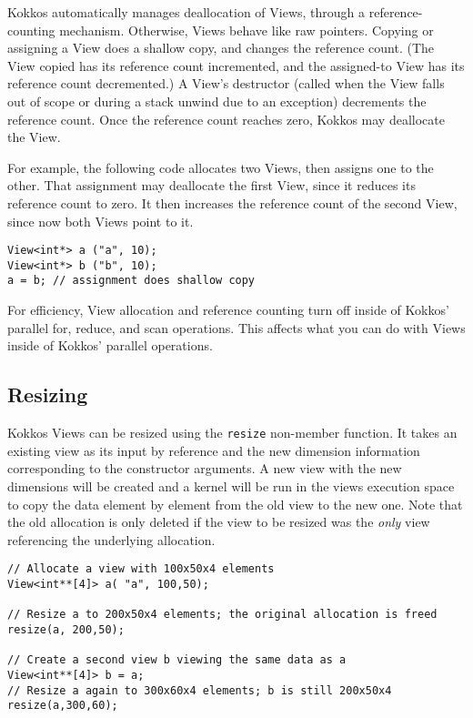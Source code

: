 Kokkos automatically manages deallocation of Views, through a
reference-counting mechanism.  Otherwise, Views behave like raw
pointers.  Copying or assigning a View does a shallow copy, and
changes the reference count.  (The View copied has its reference count
incremented, and the assigned-to View has its reference count
decremented.)  A View's destructor (called when the View falls out of
scope or during a stack unwind due to an exception) decrements the
reference count.  Once the reference count reaches zero, Kokkos may
deallocate the View.

For example, the following code allocates two Views, then assigns one
to the other.  That assignment may deallocate the first View, since it
reduces its reference count to zero.  It then increases the reference
count of the second View, since now both Views point to it.
\begin{lstlisting}
View<int*> a ("a", 10);
View<int*> b ("b", 10);
a = b; // assignment does shallow copy
\end{lstlisting}

For efficiency, View allocation and reference counting turn off inside
of Kokkos' parallel for, reduce, and scan operations.  This affects
what you can do with Views inside of Kokkos' parallel operations.

\subsection{Resizing}

Kokkos Views can be resized using the \lstinline|resize| non-member function.
It takes an existing view as its input by reference and the new dimension information
corresponding to the constructor arguments. A new view with the new dimensions will
be created and a kernel will be run in the views execution space to copy the data 
element by element from the old view to the new one. Note that the old allocation is 
only deleted if the view to be resized was the {\it only} view referencing the underlying 
allocation. 

\begin{lstlisting}
// Allocate a view with 100x50x4 elements 
View<int**[4]> a( "a", 100,50);

// Resize a to 200x50x4 elements; the original allocation is freed
resize(a, 200,50);

// Create a second view b viewing the same data as a
View<int**[4]> b = a;
// Resize a again to 300x60x4 elements; b is still 200x50x4
resize(a,300,60);
\end{lstlisting} 
 




